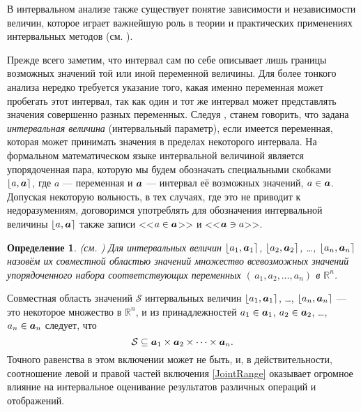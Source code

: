 \documentclass[a5paper,openany]{book}
\newcommand{\mbf}[1]{\protect\text{\boldmath$#1$}}
\newcommand{\mbb}{\mathbb}
\newcommand{\mcl}{\mathcal}
\newtheorem{definition}{Определение}[section]
\begin{document}
В интервальном анализе также существует понятие зависимости и независимости величин, 
которое играет важнейшую роль в теории и практических применениях интервальных 
методов (см. \cite{SSharyBook}). 
   
Прежде всего заметим, что интервал сам по себе описывает лишь границы возможных значений 
той или иной переменной величины. Для более тонкого анализа нередко требуется указание 
того, какая именно переменная может пробегать этот интервал, так как один и тот же 
интервал может представлять значения совершенно разных переменных. Следуя \cite{SSharyBook}, 
станем говорить, что задана \emph{интервальная величина} (интервальный параметр), если 
имеется переменная, которая может принимать значения в пределах некоторого интервала. 
На формальном математическом языке интервальной величиной является упорядоченная пара, 
которую мы будем обозначать специальными скобками $\lfloor a,\mbf{a}\rceil$, где $a$ 
--- переменная и $\mbf{a}$ --- интервал её возможных значений, $a\in\mbf{a}$. Допуская 
некоторую вольность, в тех случаях, где это не приводит к недоразумениям, договоримся 
употреблять для обозначения интервальной величины $\lfloor a,\mbf{a}\rceil$ также 
записи <<$a\in\mbf{a}$>> и <<$\mbf{a}\ni a$>>.       
  
\begin{definition} {\rm(см. \cite{SSharyBook})}   
Для интервальных величин $\lfloor a_{1}, \mbf{a}_1\rceil$, $\lfloor a_{2}, \mbf{a}_2 
\rceil$, \ldots, $\lfloor a_{n}, \mbf{a}_n\rceil$ назовём их \textsl{совместной 
областью значений} множество всевозможных значений 
упорядоченного набора соответствующих переменных $(\,a_{1}, a_{2}, \ldots, a_{n})$ 
в $\mbb{R}^n$. 
\end{definition}  
  
Совместная область значений $\mcl{S}$ интервальных величин $\lfloor a_{1}, \mbf{a}_1 
\rceil$, \ldots, $\lfloor a_{n}, \mbf{a}_n\rceil$ --- это некоторое множество 
в $\mbb{R}^n$, и из принадлежностей $a_{1}\in\mbf{a}_1$, $a_{2}\in\mbf{a}_2$, \ldots, 
$a_{n}\in\mbf{a}_n$ следует, что 
\begin{equation} 
\label{JointRange}
\mcl{S}\subseteq\mbf{a}_{1}\times\mbf{a}_{2} \times \cdots\times\mbf{a}_{n}. 
\end{equation} 
Точного равенства в этом включении может не быть, и, в действительности, соотношение 
левой и правой частей включения \eqref{JointRange} оказывает огромное влияние 
на интервальное оценивание результатов различных операций и отображений. 
  
\end{document}
